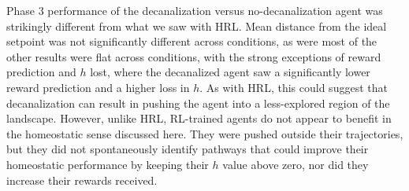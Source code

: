 Phase 3 performance of the decanalization versus no-decanalization agent was strikingly different from what we saw with HRL. Mean distance from the ideal setpoint was not significantly different across conditions, as were most of the other results were flat across conditions, with the strong exceptions of reward prediction and \(h\) lost, where the decanalized agent saw a significantly lower reward prediction and a higher loss in \(h\). As with HRL, this could suggest that decanalization can result in pushing the agent into a less-explored region of the landscape. However, unlike HRL, RL-trained agents do not appear to benefit in the homeostatic sense discussed here. They were pushed outside their trajectories, but they did not spontaneously identify pathways that could improve their homeostatic performance by keeping their \(h\) value above zero, nor did they increase their rewards received.

